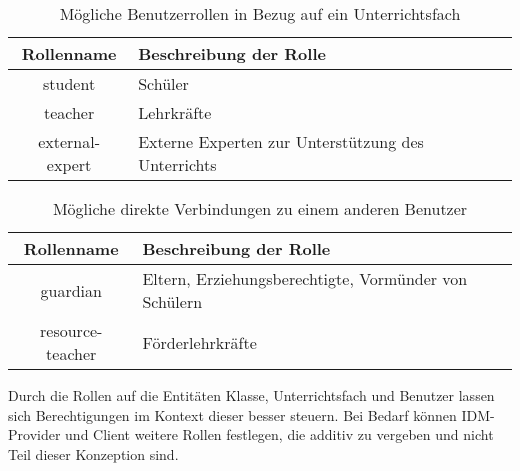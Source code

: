 \begin{table}[htb]
	\begin{tabularx}{\textwidth}{|c|X|}
		\hline
\textbf{Rollenname} & \textbf{Beschreibung der Rolle} \\ \hline
student & Schüler \\ \hline
teacher & Lehrkräfte \\ \hline
external-expert & Externe Experten zur Unterstützung des Unterrichts \\ \hline
	\end{tabularx}

		\caption{Mögliche Benutzerrollen in Bezug auf ein Unterrichtsfach}
		\label{tab:intro:rolessubject}
\end{table}

\begin{table}[htb]
	\begin{tabularx}{\textwidth}{|c|X|}
		\hline
\textbf{Rollenname} & \textbf{Beschreibung der Rolle} \\ \hline
guardian & Eltern, Erziehungsberechtigte, Vormünder von Schülern \\ \hline
resource-teacher & Förderlehrkräfte \\ \hline
	\end{tabularx}

		\caption{Mögliche direkte Verbindungen zu einem anderen Benutzer}
		\label{tab:intro:rolesuser}
\end{table}


Durch die Rollen auf die Entitäten Klasse, Unterrichtsfach und Benutzer lassen sich Berechtigungen im Kontext dieser besser steuern. 
Bei Bedarf können IDM-Provider und Client weitere Rollen festlegen, die additiv zu vergeben und nicht Teil dieser Konzeption sind.
